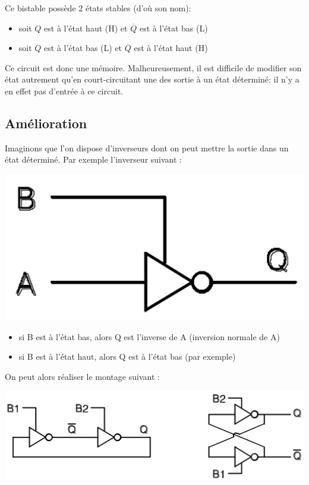 Ce bistable possède 2 états stables (d'où son nom):
\begin{itemize}
\item soit $Q$ est à l'état haut (H) et $\overline{Q}$ est à l'état bas (L)
\item soit $Q$ est à l'état bas (L) et $\overline{Q}$ est à l'état haut (H)
\end{itemize}

Ce circuit est donc une mémoire. Malheureusement, il est difficile de modifier son état autrement
qu'en court-circuitant une des sortie à un état déterminé: il n'y a en effet pas d'entrée à ce circuit.

\subsection{Amélioration}
Imaginons que l'on dispose d'inverseurs dont on peut mettre la sortie dans un état déterminé. Par
exemple l'inverseur suivant :
\begin{center}
\includegraphics[scale=0.15]{Labo3_Amelioration1.png}
\end{center}

\begin{itemize}
\item si B est à l'état bas, alors Q est l'inverse de A (inversion normale de A)
\item si B est à l'état haut, alors Q est à l'état bas (par exemple)
\end{itemize}

On peut alors réaliser le montage suivant :
\begin{center}
\includegraphics[scale=0.35]{Labo3_Amelioration2.png}
\end{center}

